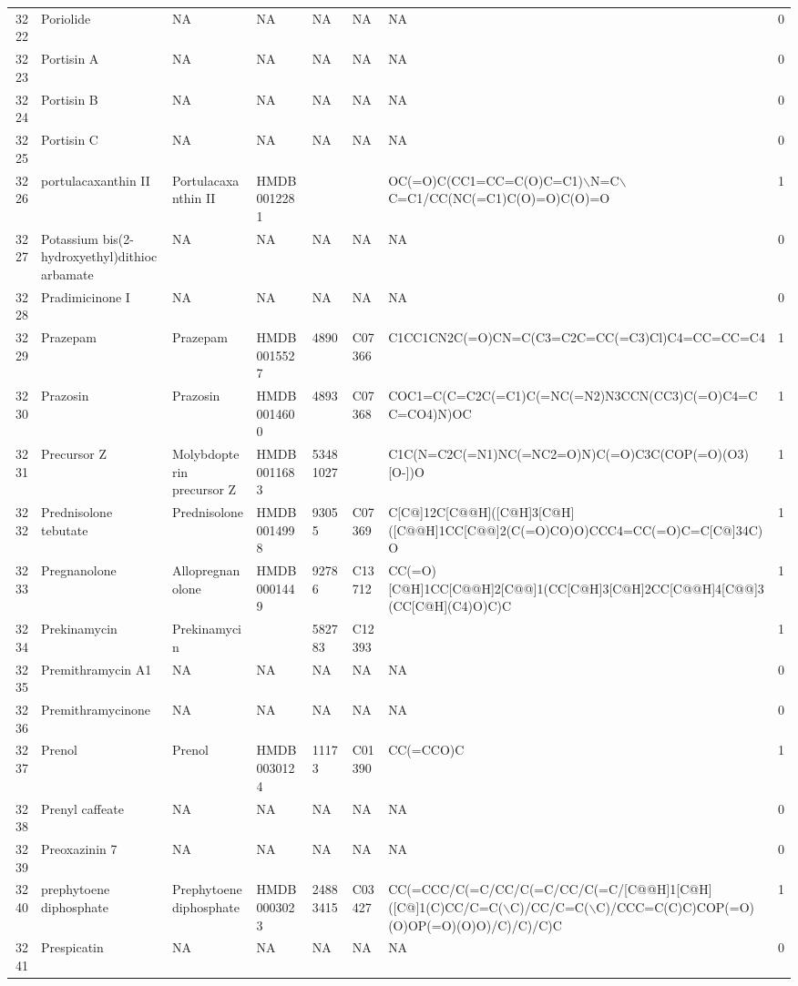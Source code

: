 \documentclass[a4paper]{article}
\begin{document}
\begin{longtable}{rlllllll}
  3222 & Poriolide & NA & NA & NA & NA & NA & 0 \\ 
  3223 & Portisin A & NA & NA & NA & NA & NA & 0 \\ 
  3224 & Portisin B & NA & NA & NA & NA & NA & 0 \\ 
  3225 & Portisin C & NA & NA & NA & NA & NA & 0 \\ 
  3226 & portulacaxanthin II & Portulacaxanthin II & HMDB0012281 &  &  & OC(=O)C(CC1=CC=C(O)C=C1)$\backslash$N=C$\backslash$C=C1/CC(NC(=C1)C(O)=O)C(O)=O & 1 \\ 
  3227 & Potassium bis(2-hydroxyethyl)dithiocarbamate & NA & NA & NA & NA & NA & 0 \\ 
  3228 & Pradimicinone I & NA & NA & NA & NA & NA & 0 \\ 
  3229 & Prazepam & Prazepam & HMDB0015527 & 4890 & C07366 & C1CC1CN2C(=O)CN=C(C3=C2C=CC(=C3)Cl)C4=CC=CC=C4 & 1 \\ 
  3230 & Prazosin & Prazosin & HMDB0014600 & 4893 & C07368 & COC1=C(C=C2C(=C1)C(=NC(=N2)N3CCN(CC3)C(=O)C4=CC=CO4)N)OC & 1 \\ 
  3231 & Precursor Z & Molybdopterin precursor Z & HMDB0011683 & 53481027 &  & C1C(N=C2C(=N1)NC(=NC2=O)N)C(=O)C3C(COP(=O)(O3)[O-])O & 1 \\ 
  3232 & Prednisolone tebutate & Prednisolone & HMDB0014998 & 93055 & C07369 & C[C@]12C[C@@H]([C@H]3[C@H]([C@@H]1CC[C@@]2(C(=O)CO)O)CCC4=CC(=O)C=C[C@]34C)O & 1 \\ 
  3233 & Pregnanolone & Allopregnanolone & HMDB0001449 & 92786 & C13712 & CC(=O)[C@H]1CC[C@@H]2[C@@]1(CC[C@H]3[C@H]2CC[C@@H]4[C@@]3(CC[C@H](C4)O)C)C & 1 \\ 
  3234 & Prekinamycin & Prekinamycin &  & 582783 & C12393 &  & 1 \\ 
  3235 & Premithramycin A1 & NA & NA & NA & NA & NA & 0 \\ 
  3236 & Premithramycinone & NA & NA & NA & NA & NA & 0 \\ 
  3237 & Prenol & Prenol & HMDB0030124 & 11173 & C01390 & CC(=CCO)C & 1 \\ 
  3238 & Prenyl caffeate & NA & NA & NA & NA & NA & 0 \\ 
  3239 & Preoxazinin 7 & NA & NA & NA & NA & NA & 0 \\ 
  3240 & prephytoene diphosphate & Prephytoene diphosphate & HMDB0003023 & 24883415 & C03427 & CC(=CCC/C(=C/CC/C(=C/CC/C(=C/[C@@H]1[C@H]([C@]1(C)CC/C=C($\backslash$C)/CC/C=C($\backslash$C)/CCC=C(C)C)COP(=O)(O)OP(=O)(O)O)/C)/C)/C)C & 1 \\ 
  3241 & Prespicatin & NA & NA & NA & NA & NA & 0 \\ 

\end{longtable}
\end{document}
